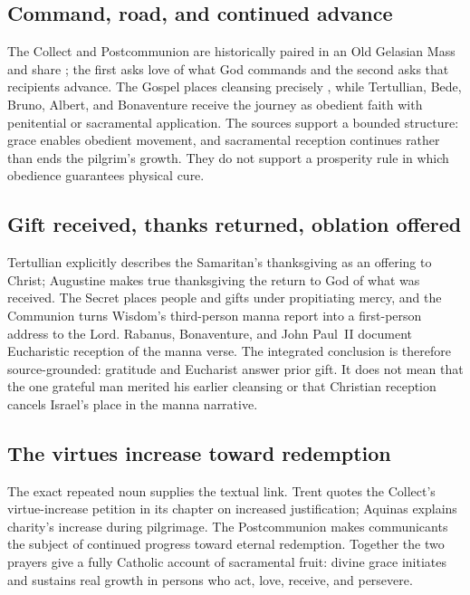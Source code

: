 \subsection*{Command, road, and continued advance\enspace{}}

The Collect and Postcommunion are historically paired in an Old Gelasian Mass
and share ; the first asks love of what God commands and the
second asks that recipients advance. The Gospel places cleansing precisely
, while Tertullian, Bede, Bruno, Albert, and Bonaventure
receive the journey as obedient faith with penitential or sacramental
application. The sources support a bounded structure: grace enables obedient
movement, and sacramental reception continues rather than ends the pilgrim's
growth. They do not support a prosperity rule in which obedience guarantees
physical cure.

\subsection*{Gift received, thanks returned, oblation offered\enspace{}}

Tertullian explicitly describes the Samaritan's thanksgiving as an offering
to Christ; Augustine makes true thanksgiving the return to God of what was
received. The Secret places people and gifts under propitiating mercy, and the
Communion turns Wisdom's third-person manna report into a first-person address
to the Lord. Rabanus, Bonaventure, and John Paul~II document Eucharistic
reception of the manna verse. The integrated conclusion is therefore
source-grounded: gratitude and Eucharist answer prior gift. It does not mean
that the one grateful man merited his earlier cleansing or that Christian
reception cancels Israel's place in the manna narrative.

\subsection*{The virtues increase toward redemption\enspace{}}

The exact repeated noun  supplies the textual link. Trent
quotes the Collect's virtue-increase petition in its chapter on increased
justification; Aquinas explains charity's increase during pilgrimage. The
Postcommunion makes communicants the subject of continued progress toward
eternal redemption. Together the two prayers give a fully Catholic account
of sacramental fruit: divine grace initiates and sustains real growth in
persons who act, love, receive, and persevere.

